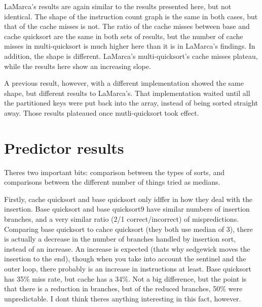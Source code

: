LaMarca's results are again similar to the results presented here, but not
identical. The shape of the instruction count graph is the same in both cases,
but that of the cache misses is not. The ratio of the cache misses between base
and cache quicksort are the same in both sets of results, but the number of
cache misses in multi-quicksort is much higher here than it is in LaMarca's
findings. In addition, the shape is different. LaMarca's multi-quicksort's
cache misses plateau, while the results here show an increasing slope.

A previous result, however, with a different implementation showed the same
shape, but different results to LaMarca's. That implementation waited until all
the partitioned keys were put back into the array, instead of being sorted
straight away. Those results plateaued once mutli-quicksort took effect.

\section{Predictor results}


Theres two important bits: comparison between the types of sorts, and comparisons between the different number of things tried as medians.

Firstly, cache quicksort and base quicksort only idffer in how they deal with
the insertion. Base quicksort and base quicksort9 have similar numbers of
insertion branches, and a very similar ratio (2/1 correct/incorrect) of
mispredictions. Comparing base quicksort to cahce quicksort (they both use
median of 3), there is actually a decrease in the number of branches handled by
insertion sort, instead of an increase. An increase is expected (thats why
sedgewick moves the insertion to the end), though when you take into account
the sentinel and the outer loop, there probably is an increase in instructions
at least. Base quicksort has 35\% miss rate, but cache has a 34\%. Not a big
difference, but the point is that there is a reduction in branches, but of the
reduced branches, 50\% were unpredictable. I dont think theres anything
interesting in this fact, however.

